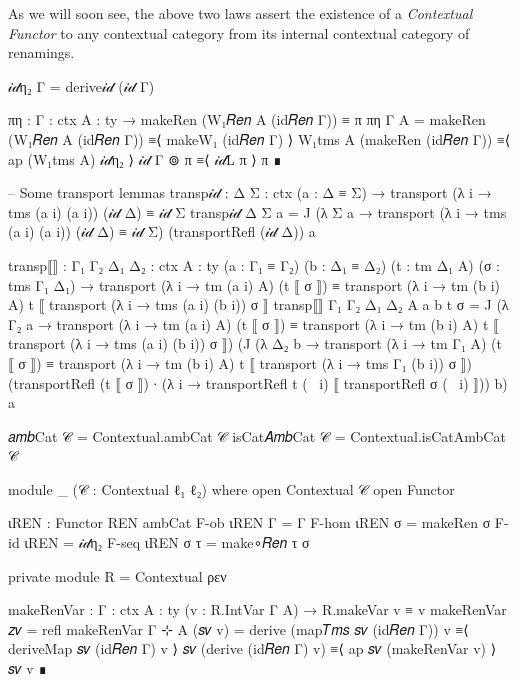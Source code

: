 As we will soon see, the above two laws assert the existence of a
\emph{Contextual Functor} to any contextual category from its internal
contextual category of renamings.
\iffalse
The above has been a tour of some of the constructions that we can make in any
contextual category. Every single one of these construction was created from
necessity and is used somewhere in the codebase. As one can see, contextual
categories admit a rich theory of variables, allowing us to recover much of the
familiar structure of type theory.
\fi
\begin{code}[hide]
  𝒾𝒹η₂ {Γ} = derive𝒾𝒹 (𝒾𝒹 Γ)

  πη : {Γ : ctx} {A : ty} → makeRen (W₁𝑅𝑒𝑛 A (id𝑅𝑒𝑛 Γ)) ≡ π
  πη {Γ} {A} =
    makeRen (W₁𝑅𝑒𝑛 A (id𝑅𝑒𝑛 Γ))
      ≡⟨ makeW₁ (id𝑅𝑒𝑛 Γ) ⟩
    W₁tms A (makeRen (id𝑅𝑒𝑛 Γ))
      ≡⟨ ap (W₁tms A) 𝒾𝒹η₂ ⟩
    𝒾𝒹 Γ ⊚ π
      ≡⟨ 𝒾𝒹L π ⟩
    π
      ∎

  -- Some transport lemmas
  transp𝒾𝒹 : {Δ Σ : ctx} (a : Δ ≡ Σ) →
    transport (λ i → tms (a i) (a i)) (𝒾𝒹 Δ) ≡ 𝒾𝒹 Σ
  transp𝒾𝒹 {Δ} {Σ} a =
    J (λ Σ a → transport (λ i → tms (a i) (a i)) (𝒾𝒹 Δ) ≡ 𝒾𝒹 Σ)
      (transportRefl (𝒾𝒹 Δ)) a

  transp⟦⟧ : {Γ₁ Γ₂ Δ₁ Δ₂ : ctx} {A : ty} (a : Γ₁ ≡ Γ₂)
    (b : Δ₁ ≡ Δ₂) (t : tm Δ₁ A) (σ : tms Γ₁ Δ₁) →
    transport (λ i → tm (a i) A) (t ⟦ σ ⟧)
      ≡ transport (λ i → tm (b i) A) t ⟦ transport (λ i → tms (a i) (b i)) σ ⟧
  transp⟦⟧ {Γ₁} {Γ₂} {Δ₁} {Δ₂} {A} a b t σ =
    J (λ Γ₂ a → transport (λ i → tm (a i) A) (t ⟦ σ ⟧)
      ≡ transport (λ i → tm (b i) A) t ⟦ transport (λ i → tms (a i) (b i)) σ ⟧)
      (J (λ Δ₂ b → transport (λ i → tm Γ₁ A) (t ⟦ σ ⟧) ≡
        transport (λ i → tm (b i) A) t ⟦ transport (λ i → tms Γ₁ (b i)) σ ⟧)
        (transportRefl (t ⟦ σ ⟧) ∙ (λ i → transportRefl t (~ i) ⟦ transportRefl σ (~ i) ⟧))
        b) a

𝑎𝑚𝑏Cat 𝒞 = Contextual.ambCat 𝒞
isCat𝐴𝑚𝑏Cat 𝒞 = Contextual.isCatAmbCat 𝒞

module _ (𝒞 : Contextual ℓ₁ ℓ₂) where
  open Contextual 𝒞
  open Functor

  ιREN : Functor REN ambCat
  F-ob ιREN Γ = Γ
  F-hom ιREN σ = makeRen σ
  F-id ιREN = 𝒾𝒹η₂
  F-seq ιREN σ τ = make∘𝑅𝑒𝑛 τ σ

  private
    module R = Contextual ρεν

  makeRenVar : {Γ : ctx} {A : ty} (v : R.IntVar Γ A) → R.makeVar v ≡ v
  makeRenVar 𝑧𝑣 = refl
  makeRenVar {Γ ⊹ A} (𝑠𝑣 v) =
    derive (map𝑇𝑚𝑠 𝑠𝑣 (id𝑅𝑒𝑛 Γ)) v
      ≡⟨ deriveMap 𝑠𝑣 (id𝑅𝑒𝑛 Γ) v ⟩
    𝑠𝑣 (derive (id𝑅𝑒𝑛 Γ) v)
      ≡⟨ ap 𝑠𝑣 (makeRenVar v) ⟩
    𝑠𝑣 v
      ∎
\end{code}

